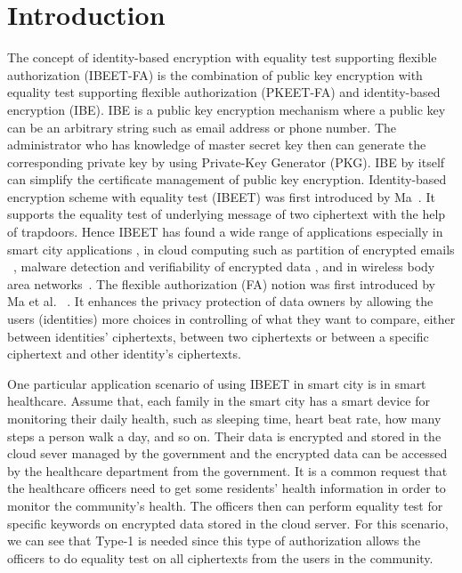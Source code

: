 \documentclass[runningheads,10pt]{llncs}
\begin{document}
\section{Introduction}
The concept of identity-based encryption with equality test supporting flexible authorization (IBEET-FA) is the combination of public key encryption with equality test supporting flexible authorization (PKEET-FA) and identity-based encryption (IBE). IBE is a public key encryption mechanism where a public key can be an arbitrary string such as email address or phone number. The administrator who has knowledge of master secret key then can generate the corresponding private key by using Private-Key Generator (PKG). IBE by itself can simplify the certificate management of public key encryption. Identity-based encryption scheme with equality test (IBEET) was first introduced by Ma~\cite{IBEET-FA-Ma16}. It supports the equality test of underlying message of two ciphertext with the help of trapdoors. Hence IBEET has found a wide range of applications especially in smart city applications \cite{WZCH18}, in cloud computing such as partition of encrypted emails ~\cite{Ma16}, malware detection and verifiability of encrypted data \cite{AAHM18}, and in  wireless body area networks~\cite{IBEET-RSA}. The flexible authorization (FA) notion was first introduced by Ma et al.  ~\cite{PKEET-FA-Maetal-16}. It enhances the privacy protection of data owners by allowing the users (identities) more choices  in controlling of what they want to compare, either between identities' ciphertexts, between two ciphertexts or between a specific ciphertext and other identity's ciphertexts.

One particular application scenario of using IBEET in smart city is in smart healthcare. Assume that, each family in the smart city has a smart device for monitoring their daily health, such as sleeping time, heart beat rate, how many steps a person walk a day, and so on. Their data is encrypted and stored in the cloud sever managed by the government and the encrypted data can be accessed by the healthcare department from the government. It is a common request that the healthcare officers need to get some residents' health information in order to monitor the community's health. The officers then can perform equality test for specific keywords on encrypted data stored in the cloud server. For this scenario, we can see that Type-1 is needed since  this type of authorization allows the officers to do equality test on all ciphertexts from the users in the community.
\end{document}
